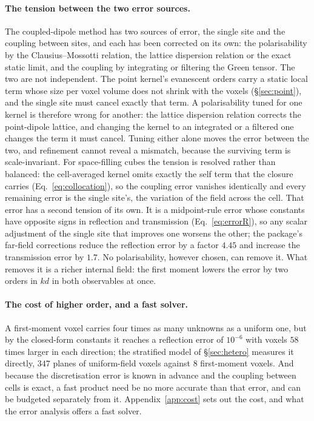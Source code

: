 \documentclass[11pt,a4paper]{article}
\begin{document}
\paragraph{The tension between the two error sources.} The coupled-dipole method has two sources
of error, the single site and the coupling between sites, and each has been corrected on its own:
the polarisability by the Clausius--Mossotti relation, the lattice dispersion relation or the exact
static limit, and the coupling by integrating or filtering the Green tensor. The two are not
independent. The point kernel's evanescent orders carry a static local term whose size per voxel
volume does not shrink with the voxels (\S\ref{sec:point}), and the single site must cancel exactly
that term. A polarisability tuned for one kernel is therefore wrong for another: the lattice
dispersion relation corrects the point-dipole lattice, and changing the kernel to an integrated or
a filtered one changes the term it must cancel. Tuning either alone moves the error between the
two, and refinement cannot reveal a mismatch, because the surviving term is scale-invariant. For
space-filling cubes the tension is resolved rather than balanced: the cell-averaged kernel omits
exactly the self term that the closure carries (Eq.~\eqref{eq:collocation}), so the coupling error
vanishes identically and every remaining error is the single site's, the variation of the field
across the cell. That error has a second tension of its own. It is a midpoint-rule error whose
constants have opposite signs in reflection and transmission (Eq.~\eqref{eq:errorR}), so any
scalar adjustment of the single site that improves one worsens the other; the package's far-field
corrections reduce the reflection error by a factor $4.45$ and increase the transmission error by
$1.7$. No polarisability, however chosen, can remove it. What removes it is a richer internal
field: the first moment lowers the error by two orders in $kd$ in both observables at once.

\paragraph{The cost of higher order, and a fast solver.} A first-moment voxel carries four times as
many unknowns as a uniform one, but by the closed-form constants it reaches a reflection error of
$10^{-6}$ with voxels $58$ times larger in each direction; the stratified model of \S\ref{sec:hetero}
measures it directly, $347$ planes of uniform-field voxels against $8$ first-moment voxels. And because
the discretisation error is known in advance and the coupling between cells is exact, a fast product
need be no more accurate than that error, and can be budgeted separately from it.
Appendix~\ref{app:cost} sets out the cost, and what the error analysis offers a fast solver.
\end{document}
